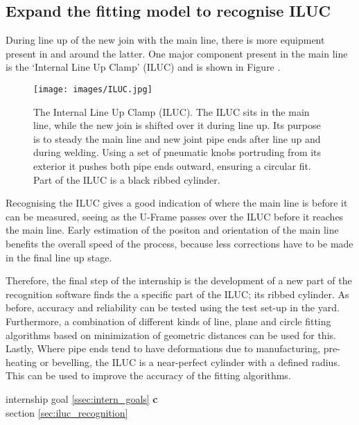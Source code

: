 \subsection{Expand the fitting model to recognise ILUC} \label{ssec:expand_model}
During line up of the new join with the main line, there is more equipment present in and around the latter. One major component present
in the main line is the `Internal Line Up Clamp' (ILUC) and is shown in Figure .
\begin{figure}[H]
    \centering
    \texttt{[image: images/ILUC.jpg]}
    \caption{The Internal Line Up Clamp (ILUC). The ILUC sits in the main line, while the new join is shifted over it during line up.
        Its purpose is to steady the main line and new joint pipe ends after line up and during welding. Using a set of pneumatic knobs
        portruding from its exterior it pushes both pipe ends outward, ensuring a circular fit.
        Part of the ILUC is a black ribbed cylinder.}
    \label{fig:iluc}
\end{figure}

Recognising the ILUC gives a good indication of where the main line
is before it can be measured, seeing as the U-Frame passes over the ILUC before it reaches the main line.
Early estimation of the positon and orientation of the main line benefits the overall speed of the process,
because less corrections have to be made in the final line up stage.

Therefore, the final step of the internship is the development of a new part of the recognition software finds the a specific part of
the ILUC; its ribbed cylinder. As before, accuracy and reliability can be tested using the test set-up in the yard. Furthermore,
a combination of different kinds of line, plane and circle fitting algorithms based on minimization of geometric distances can
be used for this. Lastly, Where pipe ends tend to have deformations due to manufacturing, pre-heating or bevelling,
the ILUC is a near-perfect cylinder with a defined radius. This can be used to improve the accuracy of the fitting algorithms.
\begin{flushright}
     internship goal \ref{ssec:intern_goals} \textbf{c}\\
    \large{} section \ref{sec:iluc_recognition}
\end{flushright}